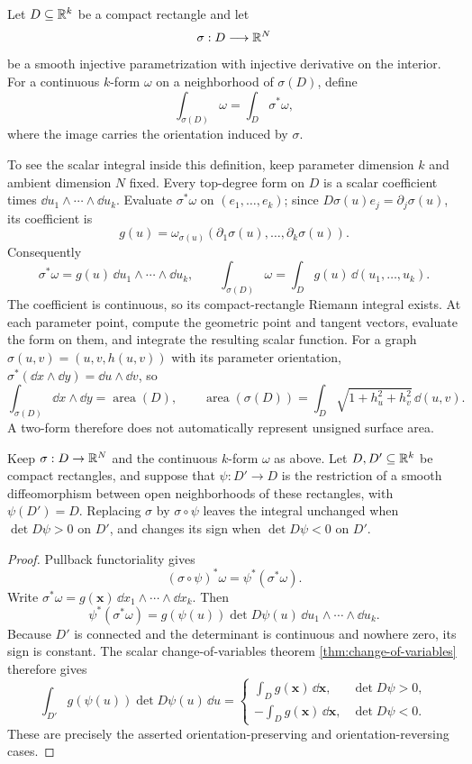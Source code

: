 \begin{definition}
Let $D\subseteq\mathbb{R}^k$ be a compact rectangle and let
\[
\sigma:D\longrightarrow\mathbb{R}^N
\]
be a smooth injective parametrization with injective derivative on the
interior. For a continuous $k$-form $\omega$ on a neighborhood of $\sigma(D)$, define
\[
\int_{\sigma(D)}\omega=\int_D\sigma^*\omega,
\]
where the image carries the orientation induced by $\sigma$.
\end{definition}

To see the scalar integral inside this definition, keep parameter dimension
$k$ and ambient dimension $N$ fixed.
Every top-degree form on $D$ is a scalar coefficient times
$\dd u_1\wedge\cdots\wedge\dd u_k$. Evaluate $\sigma^*\omega$ on
$(e_1,\ldots,e_k)$; since $D\sigma(u)e_j=\partial_j\sigma(u)$, its coefficient is
\[
g(u)=\omega_{\sigma(u)}(\partial_1\sigma(u),\ldots,\partial_k\sigma(u)).
\]
Consequently
\[
\sigma^*\omega=g(u)\,\dd u_1\wedge\cdots\wedge\dd u_k,
\qquad \int_{\sigma(D)}\omega=\int_D g(u)\,\dd(u_1,\ldots,u_k).
\]
The coefficient is continuous, so its compact-rectangle Riemann integral
exists. At each parameter point, compute the geometric point and tangent
vectors, evaluate the form on them, and integrate the resulting scalar
function.
For a graph $\sigma(u,v)=(u,v,h(u,v))$ with its parameter orientation,
$\sigma^*(\dd x\wedge\dd y)=\dd u\wedge\dd v$, so
\[
\int_{\sigma(D)}\dd x\wedge\dd y=\operatorname{area}(D),\qquad
\operatorname{area}(\sigma(D))=\int_D\sqrt{1+h_u^2+h_v^2}\,\dd(u,v).
\]
A two-form therefore does not automatically represent unsigned surface area.

\begin{proposition}
\label{prop:change-parametrization}
Keep $\sigma:D\to\mathbb{R}^N$ and the continuous $k$-form $\omega$ as above.
Let \(D,D'\subseteq\mathbb{R}^k\) be compact rectangles, and suppose that
\(\psi:D'\to D\) is the restriction of a smooth diffeomorphism between open
neighborhoods of these rectangles, with \(\psi(D')=D\).  Replacing \(\sigma\)
by \(\sigma\circ\psi\) leaves the integral unchanged when
\(\det D\psi>0\) on \(D'\), and changes its sign when
\(\det D\psi<0\) on \(D'\).
\end{proposition}
\begin{proof}
Pullback functoriality gives
\[
(\sigma\circ\psi)^*\omega=\psi^*(\sigma^*\omega).
\]
Write \(\sigma^*\omega=g(\mathbf{x})\,\dd x_1\wedge\cdots\wedge\dd x_k\).  Then
\[
\psi^*(\sigma^*\omega)
=g(\psi(u))\det D\psi(u)\,
\dd u_1\wedge\cdots\wedge\dd u_k.
\]
Because \(D'\) is connected and the determinant is continuous and nowhere
zero, its sign is constant.  The scalar change-of-variables theorem
\cref{thm:change-of-variables} therefore gives
\[
\int_{D'}g(\psi(u))\det D\psi(u)\,\dd u
=
\begin{cases}
\displaystyle\int_Dg(\mathbf{x})\,\dd\mathbf{x},&\det D\psi>0,\\[4pt]
\displaystyle-\int_Dg(\mathbf{x})\,\dd\mathbf{x},&\det D\psi<0.
\end{cases}
\]
These are precisely the asserted orientation-preserving and
orientation-reversing cases.
\end{proof}



